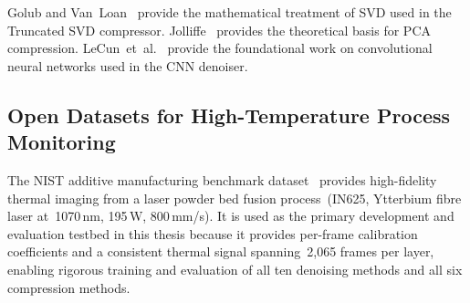 Golub and Van~Loan~\cite{golub2013matrix} provide the mathematical treatment of SVD used in the Truncated SVD compressor. Jolliffe~\cite{jolliffe2002principal} provides the theoretical basis for PCA compression. LeCun~et~al.~\cite{lecun1989backpropagation} provide the foundational work on convolutional neural networks used in the CNN denoiser.

\subsection{Open Datasets for High-Temperature Process Monitoring}

The NIST additive manufacturing benchmark dataset~\cite{nist_dataset} provides high-fidelity thermal imaging from a laser powder bed fusion process~(IN625, Ytterbium fibre laser at~1070\,nm, 195\,W, 800\,mm/s). It is used as the primary development and evaluation testbed in this thesis because it provides per-frame calibration coefficients and a consistent thermal signal spanning~2,065 frames per layer, enabling rigorous training and evaluation of all ten denoising methods and all six compression methods.

\let\cleardoublepage\clearpage
